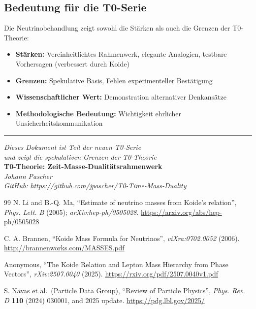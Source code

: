 	\subsection{Bedeutung für die T0-Serie}
	
	Die Neutrinobehandlung zeigt sowohl die Stärken als auch die Grenzen der T0-Theorie:
	
	\begin{itemize}
		\item \textbf{Stärken:} Vereinheitlichtes Rahmenwerk, elegante Analogien, testbare Vorhersagen (verbessert durch Koide)
		\item \textbf{Grenzen:} Spekulative Basis, Fehlen experimenteller Bestätigung
		\item \textbf{Wissenschaftlicher Wert:} Demonstration alternativer Denkansätze
		\item \textbf{Methodologische Bedeutung:} Wichtigkeit ehrlicher Unsicherheitskommunikation
	\end{itemize}
	
	\begin{center}
		\hrule
		\vspace{0.5cm}
		\textit{Dieses Dokument ist Teil der neuen T0-Serie}\\
		\textit{und zeigt die spekulativen Grenzen der T0-Theorie}\\
		\vspace{0.3cm}
		\textbf{T0-Theorie: Zeit-Masse-Dualitätsrahmenwerk}\\
		\textit{Johann Pascher}\\
		
		\textit{GitHub: https://github.com/jpascher/T0-Time-Mass-Duality}
		\vspace{0.3cm}
	\end{center}
	
	\begin{thebibliography}{99}
		N. Li and B.-Q. Ma, ``Estimate of neutrino masses from Koide's relation'', \textit{Phys. Lett. B} (2005); \textit{arXiv:hep-ph/0505028}.
		\url{https://arxiv.org/abs/hep-ph/0505028}
		
		C. A. Brannen, ``Koide Mass Formula for Neutrinos'', \textit{viXra:0702.0052} (2006).
		\url{http://brannenworks.com/MASSES.pdf}
		
		Anonymous, ``The Koide Relation and Lepton Mass Hierarchy from Phase Vectors'', \textit{rXiv:2507.0040} (2025).
		\url{https://rxiv.org/pdf/2507.0040v1.pdf}
		
		S. Navas et al.\ (Particle Data Group), ``Review of Particle Physics'', \textit{Phys. Rev. D} \textbf{110} (2024) 030001, and 2025 update.
		\url{https://pdg.lbl.gov/2025/}
		
	\end{thebibliography}
	